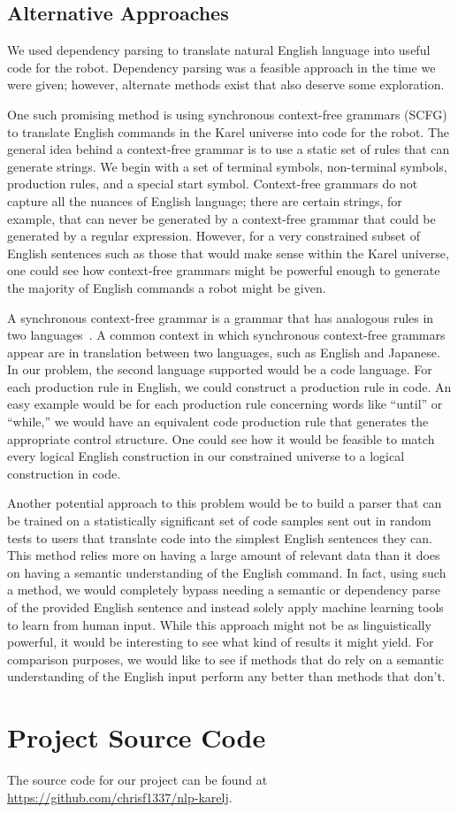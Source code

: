 \documentclass[11pt]{article}
\begin{document}
\subsection{Alternative Approaches}
We used dependency parsing to translate natural English language into useful code
for the robot.  Dependency parsing was a feasible approach in the time we were given; however,
alternate methods exist that also deserve some exploration.

One such promising method is using synchronous context-free grammars (SCFG) to translate English
commands in the Karel universe into code for the robot.  The general idea behind a context-free
grammar is to use a static set of rules that can generate strings.  We begin with a set of terminal
symbols, non-terminal symbols, production rules, and a special start symbol.  Context-free grammars
do not capture all the nuances of English language; there are certain strings, for example, that
can never be generated by a context-free grammar that could be generated by a regular expression.
However, for a very constrained subset of English sentences such as those that would make sense
within the Karel universe, one could see how context-free grammars might be powerful enough to
generate the majority of English commands a robot might be given.

A synchronous context-free grammar is a grammar that has analogous rules in two
languages~\cite{Chiang:2006aa}. A common context in which synchronous context-free grammars appear
are in translation between two languages, such as English and Japanese.  In our problem, the second
language supported would be a code language.  For each production rule in English, we could
construct a production rule in code. An easy example would be for each production rule concerning
words like ``until'' or ``while,'' we would have an equivalent code production rule that generates
the appropriate control structure. One could see how it would be feasible to match every logical
English construction in our constrained universe to a logical construction in code.

Another potential approach to this problem would be to build a parser that can be trained on a
statistically significant set of code samples sent out in random tests to users that translate code
into the simplest English sentences they can.  This method relies more on having a large amount of
relevant data than it does on having a semantic understanding of the English command.  In fact,
using such a method, we would completely bypass needing a semantic or dependency parse of the
provided English sentence and instead solely apply machine learning tools to learn from human
input.  While this approach might not be as linguistically powerful, it would be interesting to see
what kind of results it might yield.  For comparison purposes, we would like to see if methods that
do rely on a semantic understanding of the English input perform any better than methods that
don't.

%
%



\appendix

\section{Project Source Code}
The source code for our project can be found at \url{https://github.com/chrisf1337/nlp-karelj}.
\end{document}
